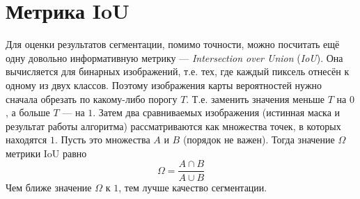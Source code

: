 \section{Метрика IoU}
Для оценки результатов сегментации, помимо точности, можно посчитать ещё одну
довольно информативную метрику --- \textit{Intersection over Union}
(\textit{IoU}). Она вычисляется для бинарных изображений, т.е. тех, где каждый
пиксель отнесён к одному из двух классов. Поэтому изображения карты вероятностей
нужно сначала обрезать по какому-либо порогу $T$. Т.е. заменить значения меньше
$T$ на $0$, а больше $T$ --- на $1$. Затем два сравниваемых изображения
(истинная маска и результат работы алгоритма) рассматриваются как множества
точек, в которых находятся $1$. Пусть это множества $A$ и $B$ (порядок не
важен). Тогда значение $\Omega$ метрики IoU равно
$$
\Omega = \frac{A \cap B}{A \cup B}
$$
Чем ближе значение $\Omega$ к $1$, тем лучше качество сегментации.
